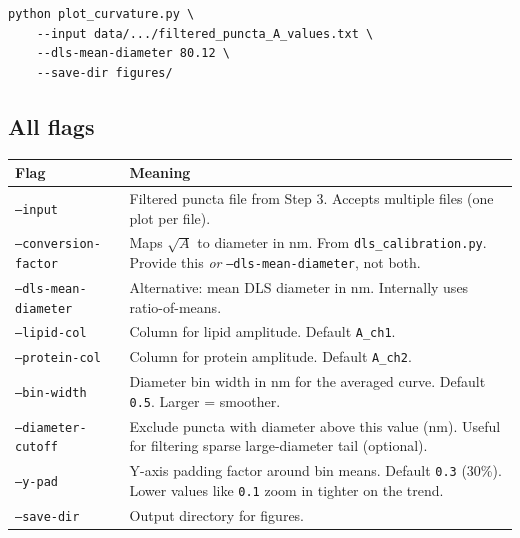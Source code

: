 \documentclass[11pt]{article}
\newcommand{\code}[1]{\texttt{#1}}
\newcommand{\flag}[1]{\texttt{#1}}
\begin{document}
\begin{lstlisting}
python plot_curvature.py \
    --input data/.../filtered_puncta_A_values.txt \
    --dls-mean-diameter 80.12 \
    --save-dir figures/
\end{lstlisting}

\subsection*{All flags}

\begin{tabularx}{\linewidth}{l X}
\toprule
\textbf{Flag} & \textbf{Meaning} \\
\midrule
\flag{--input}              & Filtered puncta file from Step 3. Accepts
                              multiple files (one plot per file). \\
\flag{--conversion-factor}  & Maps $\sqrt{A}$ to diameter in nm. From
                              \code{dls\_calibration.py}. Provide
                              this \emph{or} \code{--dls-mean-diameter},
                              not both. \\
\flag{--dls-mean-diameter}  & Alternative: mean DLS diameter in nm.
                              Internally uses ratio-of-means. \\
\flag{--lipid-col}          & Column for lipid amplitude. Default
                              \code{A\_ch1}. \\
\flag{--protein-col}        & Column for protein amplitude. Default
                              \code{A\_ch2}. \\
\flag{--bin-width}          & Diameter bin width in nm for the averaged
                              curve. Default \code{0.5}. Larger =
                              smoother. \\
\flag{--diameter-cutoff}    & Exclude puncta with diameter above this
                              value (nm). Useful for filtering sparse
                              large-diameter tail (optional). \\
\flag{--y-pad}              & Y-axis padding factor around bin means.
                              Default \code{0.3} (30\%). Lower values
                              like \code{0.1} zoom in tighter on the
                              trend. \\
\flag{--save-dir}           & Output directory for figures. \\
\bottomrule
\end{tabularx}
\end{document}
